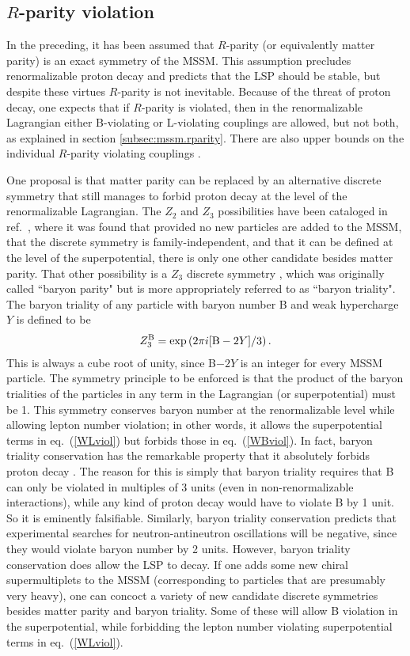 \documentclass[11pt]{article}
\def\beq{\begin{eqnarray}}
\def\eeq{\end{eqnarray}}
\begin{document}
\subsection{$R$-parity violation}\label{subsec:variations.RPV}
\setcounter{equation}{0}

In the preceding, it has been assumed that $R$-parity (or equivalently matter parity) is
an exact symmetry of the MSSM. This assumption precludes renormalizable
proton decay and predicts that the LSP should be stable, but despite these
virtues $R$-parity is not inevitable. Because of the threat of proton
decay, one expects that if $R$-parity is violated, then in the
renormalizable Lagrangian either B-violating or L-violating couplings are
allowed, but not both, as explained in section \ref{subsec:mssm.rparity}. 
There are also upper bounds on the individual $R$-parity violating
couplings \cite{RPVreviews}. 

One proposal is that matter parity can be replaced by an alternative
discrete symmetry that still manages to forbid proton decay at the level
of the renormalizable Lagrangian. The $Z_2$ and $Z_3$ possibilities have
been cataloged in ref.~\cite{baryontriality}, where it was found that
provided no new particles are added to the MSSM, that the discrete
symmetry is family-independent, and that it can be defined at the level of
the superpotential, there is only one other candidate besides matter
parity. That other possibility is a $Z_3$ discrete symmetry
\cite{baryontriality}, which was originally called ``baryon parity" but is
more appropriately referred to as ``baryon triality". The baryon triality
of any particle with baryon number B and weak hypercharge $Y$ is defined
to be
\beq
Z_3^{\rm B} = {\rm exp}\left ({2\pi i} [{\rm B}-2Y]/3 \right ).
\eeq
This is always a cube root of unity, since B$-2Y$ is an integer for every
MSSM particle. The symmetry principle to be enforced is that the product
of the baryon trialities of the particles in any term in the Lagrangian
(or superpotential) must be 1. This symmetry conserves baryon number at
the renormalizable level while allowing lepton number violation; in other
words, it allows the superpotential terms in eq.~(\ref{WLviol}) but
forbids those in eq.~(\ref{WBviol}). In fact, baryon triality conservation
has the remarkable property that it absolutely forbids proton
decay \cite{noprotondecay}. The reason for this is simply that baryon
triality requires that B can only be violated in multiples of 3 units
(even in non-renormalizable interactions), while any kind of proton decay
would have to violate B by 1 unit. So it is eminently falsifiable.
Similarly, baryon triality conservation predicts that experimental
searches for neutron-antineutron oscillations will be negative, since they
would violate baryon number by 2 units. However, baryon triality
conservation does allow the LSP to decay. If one adds some new chiral
supermultiplets to the MSSM (corresponding to particles that are
presumably very heavy), one can concoct a variety of new candidate
discrete symmetries besides matter parity and baryon triality. Some of
these will allow B violation in the superpotential, while forbidding the
lepton number violating superpotential terms in eq.~(\ref{WLviol}). 
\end{document}
